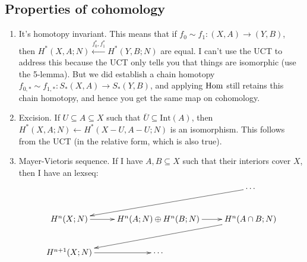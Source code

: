 \subsection{Properties of cohomology}
\begin{enumerate}
\item It's homotopy invariant. This means that if $f_0\sim f_1:(X,A)\to (Y,B)$, then $ H^\ast(X,A;N)\xleftarrow{f_0^\ast,f_1^\ast} H^\ast(Y,B;N)$ are equal. I can't use the UCT to address this because the UCT only tells you that things are isomorphic (use the 5-lemma). But we did establish a chain homotopy $f_{0,\ast}\sim f_{1,\ast}:S_\ast(X,A)\to S_\ast(Y,B)$, and applying $\operatorname{Hom}$ still retains this chain homotopy, and hence you get the same map on cohomology.
\item Excision. If $U\subseteq A\subseteq X$ such that $\overline{U}\subseteq\mathrm{Int}(A)$, then $ H^\ast(X,A;N)\leftarrow H^\ast(X-U,A-U;N)$ is an isomorphism. This follows from the UCT (in the relative form, which is also true).
\item Mayer-Vietoris sequence. If I have $A,B\subseteq X$ such that their interiors cover $X$, then I have an lexseq:
\begin{equation*}
\xymatrix{ & & \cdots\ar[dll]\\
 H^n(X;N)\ar[r] & H^n(A;N)\oplus H^n(B;N)\ar[r] & H^n(A\cap B;N)\ar[dll]\\
 H^{n+1}(X;N)\ar[r] & \cdots & }
\end{equation*}
\end{enumerate}
